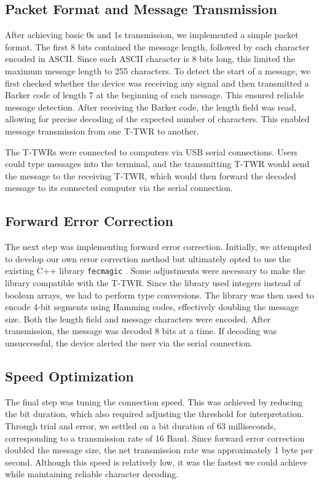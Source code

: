 \subsection{Packet Format and Message Transmission}

After achieving basic 0s and 1s transmission, we implemented a simple packet format. The first 8 bits contained the message length, followed by each character encoded in ASCII. Since each ASCII character is 8 bits long, this limited the maximum message length to 255 characters. To detect the start of a message, we first checked whether the device was receiving any signal and then transmitted a Barker code of length 7 at the beginning of each message. This ensured reliable message detection. After receiving the Barker code, the length field was read, allowing for precise decoding of the expected number of characters. This enabled message transmission from one T-TWR to another.

The T-TWRs were connected to computers via USB serial connections. Users could type messages into the terminal, and the transmitting T-TWR would send the message to the receiving T-TWR, which would then forward the decoded message to its connected computer via the serial connection.

\subsection{Forward Error Correction}

The next step was implementing forward error correction. Initially, we attempted to develop our own error correction method but ultimately opted to use the existing C++ library \texttt{fecmagic} \cite{kristof2020}. Some adjustments were necessary to make the library compatible with the T-TWR. Since the library used integers instead of boolean arrays, we had to perform type conversions. The library was then used to encode 4-bit segments using Hamming codes, effectively doubling the message size. Both the length field and message characters were encoded. After transmission, the message was decoded 8 bits at a time. If decoding was unsuccessful, the device alerted the user via the serial connection.

\subsection{Speed Optimization}

The final step was tuning the connection speed. This was achieved by reducing the bit duration, which also required adjusting the threshold for interpretation. Through trial and error, we settled on a bit duration of 63 milliseconds, corresponding to a transmission rate of 16 Baud. Since forward error correction doubled the message size, the net transmission rate was approximately 1 byte per second. Although this speed is relatively low, it was the fastest we could achieve while maintaining reliable character decoding.

